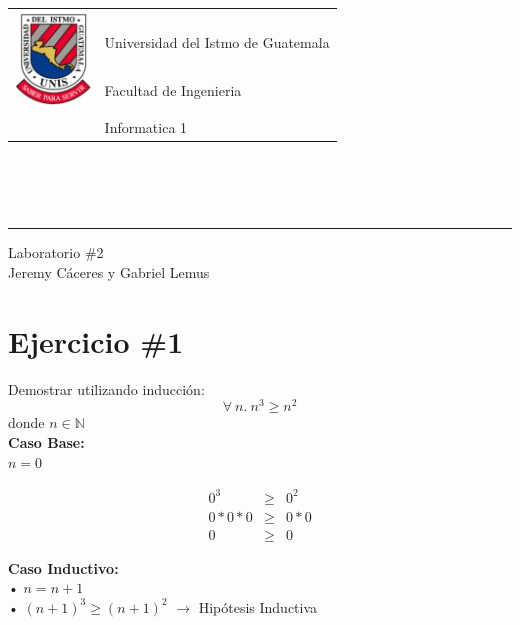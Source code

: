 \documentclass[11pt,letterpaper]{article}
\begin{document}
\begin{tabular}{l l}
\multirow{3}{*}{\includegraphics[width=2cm]{../../recursos/logo}} 
 & \\
 & \LARGE Universidad del Istmo de Guatemala \\
 & \LARGE Facultad de Ingenieria \\
 & \LARGE Informatica 1 \\
\end{tabular}
\\\\\\

\begin{center}
	\hrule
	\vspace{0.5cm}
	\huge{Laboratorio \#2} \\
	\vspace{0.1cm}
    \Large{Jeremy Cáceres y Gabriel Lemus}\\
    \vspace{0.05cm}
    \hrulefill
\end{center}
\vspace{0.3cm}

\section*{\Large Ejercicio \#1}
\noindent Demostrar utilizando inducción:
\[
        \forall\ n.\ n^3\geq n^2
\]
donde $n\in\mathbb{N}$
\\

\noindent \textbf{\large Caso Base:}\\
\noindent $n=0$

\begin{eqnarray*}
0^3 &\geq& 0^2 \\
0*0*0 &\geq& 0*0 \\
0 &\geq& 0
\end{eqnarray*}

\vspace{0.1cm}

\noindent \textbf{\large Caso Inductivo:}\\
\noindent • $n=n+1$ \\
\noindent • $(n+1)^3\geq(n+1)^2$ $\rightarrow$ Hipótesis Inductiva \\
\end{document}
